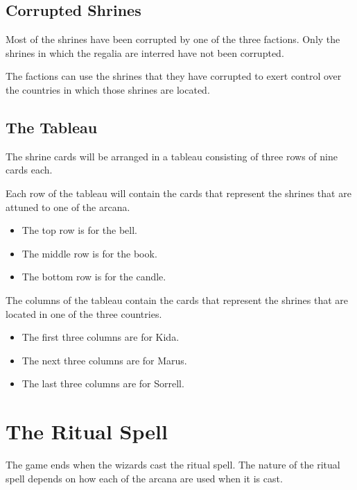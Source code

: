 \documentclass[10pt, parskip=half-, twoside]{scrartcl}
\begin{document}
\subsection*{Corrupted Shrines}
Most of the shrines have been corrupted by one of the three factions. Only the shrines in which the regalia are interred have not been corrupted.

The factions can use the shrines that they have corrupted to exert control over the countries in which those shrines are located.

\newpage

\subsection*{The Tableau}
The shrine cards will be arranged in a tableau consisting of three rows of nine cards each.

Each row of the tableau will contain the cards that represent the shrines that are attuned to one of the arcana.
\begin{itemize}[itemindent=*, leftmargin=*]
\item The top row is for the bell.
\item The middle row is for the book.
\item The bottom row is for the candle.
\end{itemize}

The columns of the tableau contain the cards that represent the shrines that are located in one of the three countries.
\begin{itemize}[itemindent=*, leftmargin=*]
\item The first three columns are for Kida.
\item The next three columns are for Marus.
\item The last three columns are for Sorrell.
\end{itemize}




\newpage

\section*{The Ritual Spell}
The game ends when the wizards cast the ritual spell. The nature of the ritual spell depends on how each of the arcana are used when it is cast.
\end{document}
